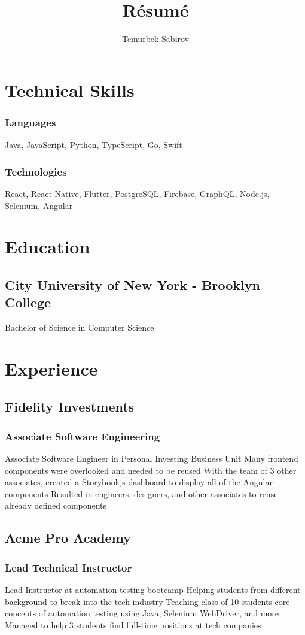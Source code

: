 \documentclass{article}
\begin{document}
\title{R\'esum\'e}
\author{Temurbek Sabirov}

\maketitle

\section{Technical Skills}
\subsubsection{Languages}
Java, JavaScript, Python, TypeScript, Go, Swift
\subsubsection{Technologies}
React, React Native, Flutter, PostgreSQL, Firebase, GraphQL, Node.js, Selenium, Angular
\section{Education}
\subsection{City University of New York - Brooklyn College}
Bachelor of Science in Computer Science
\section{Experience}
\subsection{Fidelity Investments}
\subsubsection{Associate Software Engineering}
Associate Software Engineer in Personal Investing Business Unit
Many frontend components were overlooked and needed to be reused
With the team of 3 other associates, created a Storybookjs dashboard to display all of the Angular components
Resulted in engineers, designers, and other associates to reuse already defined components
\subsection{Acme Pro Academy}
\subsubsection{Lead Technical Instructor}
Lead Instructor at automation testing bootcamp
Helping students from different background to break into the tech industry
Teaching class of 10 students core concepts of automation testing using Java, Selenium WebDriver, and more
Managed to help 3 students find full-time positions at tech companies
\end{document}
